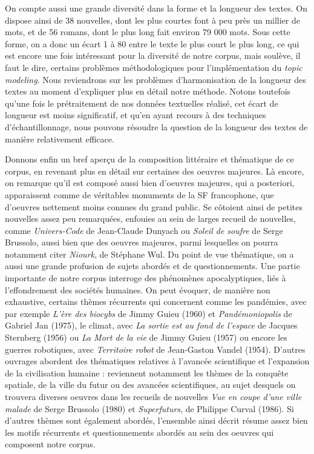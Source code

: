 \documentclass[letterpaper,portrait,12pt]{article}
\begin{document}
	On compte aussi une grande diversit\'{e} dans la forme et la longueur des textes. On dispose ainsi de 38 nouvelles, dont les plus courtes font \`{a} peu pr\`{e}s un millier de mots, et de 56 romans, dont le plus long fait environ 79 000 mots. Sous cette forme, on a donc un \'{e}cart 1 \`{a} 80 entre le texte le plus court le plus long, ce qui est encore une fois int\'{e}ressant pour la diversit\'{e} de notre corpus, mais soul\`{e}ve, il faut le dire, certains probl\`{e}mes m\'{e}thodologiques pour l'impl\'{e}mentation du \emph{topic modeling}. Nous reviendrons sur les probl\`{e}mes d'harmonisation de la longueur des textes au moment d'expliquer plus en d\'{e}tail notre m\'{e}thode. Notons toutefois qu'une fois le pr\'{e}traitement de nos donn\'{e}es textuelles r\'{e}alis\'{e}, cet \'{e}cart de longueur est moins significatif, et qu'en ayant recours \`{a} des techniques d'\'{e}chantillonnage, nous pouvons r\'{e}soudre la question de la longueur des textes de mani\`{e}re relativement efficace.





\textbf{	}Donnons enfin un bref aper\c{c}u de la composition litt\'{e}raire et th\'{e}matique de ce corpus, en revenant plus en d\'{e}tail sur certaines des oeuvres majeures. L\`{a} encore, on remarque qu'il est compos\'{e} aussi bien d'oeuvres majeures, qui a posteriori, apparaissent comme de v\'{e}ritables monuments de la SF francophone, que d'oeuvres nettement moins connues du grand public. Se c\^{o}toient ainsi de petites nouvelles assez peu remarqu\'{e}es, enfouies au sein de larges recueil de nouvelles, comme \emph{Univers-Code }de Jean-Claude Dunyach ou \emph{Soleil de soufre} de Serge Brussolo, aussi bien que des oeuvres majeures, parmi lesquelles on pourra notamment citer \emph{Niourk}, de St\'{e}phane Wul. Du point de vue th\'{e}matique, on a aussi une grande profusion de sujets abord\'{e}s et de questionnements. Une partie importante de notre corpus interroge des ph\'{e}nom\`{e}nes apocalyptiques, li\'{e}s \`{a} l'effondrement des soci\'{e}t\'{e}s humaines. On peut \'{e}voquer, de mani\`{e}re non exhaustive, certains th\`{e}mes r\'{e}currents qui concernent comme les pand\'{e}mies, avec par exemple \emph{L'\`{e}re des biocybs} de Jimmy Guieu (1960) et \emph{Pand\'{e}moniopolis} de Gabriel Jan (1975), le climat, avec \emph{La sortie est au fond de l'espace} de Jacques Sternberg (1956) ou \emph{La Mort de la vie }de Jimmy Guieu (1957) ou encore les guerres robotiques, avec \emph{Territoire robot }de Jean-Gaston Vandel (1954). D'autres ouvrages abordent des th\'{e}matiques relatives \`{a} l'avanc\'{e}e scientifique et l'expansion de la civilisation humaine : reviennent notamment les th\`{e}mes de la conqu\^{e}te spatiale, de la ville du futur ou des avanc\'{e}es scientifiques, au sujet desquels on trouvera diverses oeuvres dans les recueils de nouvelles\emph{ Vue en coupe d'une ville malade} de Serge Brussolo (1980) et \emph{Superfuturs}, de Philippe Curval (1986). Si d'autres th\`{e}mes sont \'{e}galement abord\'{e}s, l'ensemble ainsi d\'{e}crit r\'{e}sume assez bien les motifs r\'{e}currents et questionnements abord\'{e}s au sein des oeuvres qui composent notre corpus.
\end{document}
